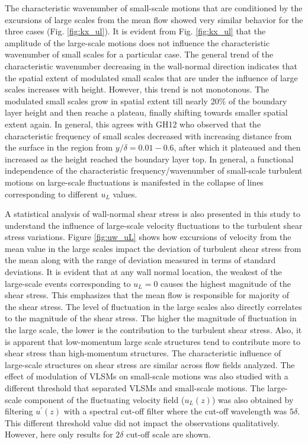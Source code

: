 The characteristic wavenumber of small-scale motions that are conditioned by the excursions of large scales from the mean flow showed very similar behavior for the three cases (Fig. \ref{fig:kx_ul}).
It is evident from Fig. \ref{fig:kx_ul} that the amplitude of the large-scale motions does not influence the characteristic wavenumber of small scales for a particular case. The general trend of the characteristic wavenumber decreasing in the wall-normal direction indicates that the spatial extent of modulated small scales that are under the influence of large scales increases with height. However, this trend is not monotonous. The modulated small scales grow in spatial extent till nearly 20\% of the boundary layer height and then reache a plateau, finally shifting towards smaller spatial extent again. In general, this agrees with GH12 who observed that the characteristic frequency of small scales decreased with increasing distance from the surface in the region from $y/\delta=0.01-0.6$, after which it plateaued and then increased as the height reached the boundary layer top. In general, a functional independence of the characteristic frequency/wavenumber of small-scale turbulent motions on large-scale fluctuations is manifested in the collapse of lines corresponding to different $u_L$ values. 

A statistical analysis of wall-normal shear stress is also presented in this study to understand the influence of large-scale velocity fluctuations to the turbulent shear stress variations. Figure \ref{fig:uw_uL} shows how excursions of velocity from the mean value in the large scales impact the deviation of turbulent shear stress from the mean along with the range of deviation measured in terms of standard deviations. It is evident that at any wall normal location, the weakest of the large-scale events corresponding to $u_L=0$ causes the highest magnitude of the shear stress. This emphasizes that the mean flow is responsible for majority of the shear stress. The level of fluctuation in the large scales also directly correlates to the magnitude of the shear stress. The higher the magnitude of fluctuation in the large scale, the lower is the contribution to the turbulent shear stress. Also, it is apparent that low-momentum large scale structures tend to contribute more to shear stress than high-momentum structures. The characteristic influence of large-scale structures on shear stress are similar across flow fields analyzed. The effect of modulation of VLSMs on small-scale motions was also studied with a different threshold that separated VLSMs and small-scale motions. The large-scale component of the fluctuating velocity field ($u_L(z)$) was also obtained by filtering $u^\prime(z)$ with a spectral cut-off filter where the cut-off wavelength was $5\delta$. This different threshold value did not impact the observations qualitatively. However, here only results for $2\delta$ cut-off scale are shown.

